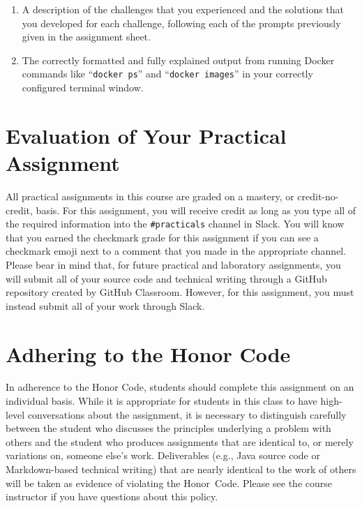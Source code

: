 \documentclass[11pt]{article}
\newcommand{\command}[1]{``\lstinline{#1}''}
\newcommand{\url}[1]{\lstinline{#1}}
\begin{document}
\vspace*{-.025in}

\begin{enumerate}

  \setlength{\itemsep}{0in}

  \item A description of the challenges that you experienced and the solutions
    that you developed for each challenge, following each of the prompts
    previously given in the assignment sheet.

  \item The correctly formatted and fully explained output from running Docker
    commands like \command{docker ps} and \command{docker images} in your
    correctly configured terminal window.

\end{enumerate}

\vspace*{-.075in}

\section*{Evaluation of Your Practical Assignment}

All practical assignments in this course are graded on a mastery, or
credit-no-credit, basis. For this assignment, you will receive credit as long as
you type all of the required information into the \url{#practicals} channel in
Slack. You will know that you earned the checkmark grade for this assignment if
you can see a checkmark emoji next to a comment that you made in the appropriate
channel. Please bear in mind that, for future practical and laboratory
assignments, you will submit all of your source code and technical writing
through a GitHub repository created by GitHub Classroom. However, for this
assignment, you must instead submit all of your work through Slack.

\section*{Adhering to the Honor Code}

In adherence to the Honor Code, students should complete this assignment on an
individual basis. While it is appropriate for students in this class to have
high-level conversations about the assignment, it is necessary to distinguish
carefully between the student who discusses the principles underlying a problem
with others and the student who produces assignments that are identical to, or
merely variations on, someone else's work. Deliverables (e.g., Java source code
or Markdown-based technical writing) that are nearly identical to the work of
others will be taken as evidence of violating the \mbox{Honor Code}. Please see
the course instructor if you have questions about this policy.
\end{document}
